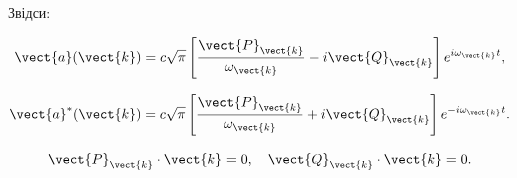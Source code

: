 Звідси:

\begin{equation*}
	\vect{a}(\vect{k}) = c\sqrt{\pi} \left[ \frac{\vect{P}_{\vect{k}}}{\omega_{\vect{k}}} - i\vect{Q}_{\vect{k}} \right] e^{i\omega_{\vect{k}} t},
\end{equation*}

\begin{equation*}
	\vect{a}^*(\vect{k}) = c\sqrt{\pi} \left[ \frac{\vect{P}_{\vect{k}}}{\omega_{\vect{k}}} + i\vect{Q}_{\vect{k}} \right] e^{-i\omega_{\vect{k}} t}.
\end{equation*}

\begin{equation*}
	\vect{P}_{\vect{k}} \cdot \vect{k} = 0, \quad \vect{Q}_{\vect{k}} \cdot \vect{k} = 0.
\end{equation*}

